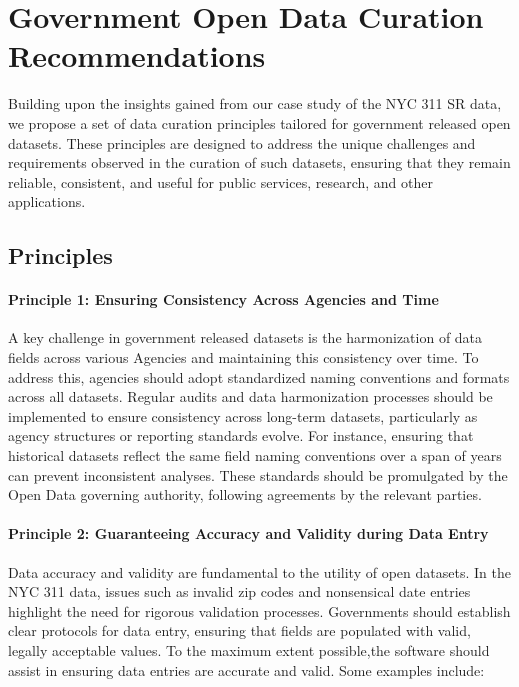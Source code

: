 \documentclass[linenumber]{jdsart}
\begin{document}
\section{Government Open Data Curation Recommendations}
\label{sec:recommendations}
Building upon the insights gained from our case study of the 
NYC 311 SR data, we propose a set of data 
curation principles tailored for government released open datasets. 
These principles are designed to address the unique challenges 
and requirements observed in the curation of such datasets, 
ensuring that they remain reliable, consistent, and useful for 
public services, research, and other applications.

\subsection{Principles}
\paragraph{Principle 1: Ensuring Consistency Across Agencies and Time}
A key challenge in government released datasets is the 
harmonization of data fields across various Agencies and 
maintaining this consistency over time. To address this, agencies should adopt 
standardized naming conventions and formats across all datasets. 
Regular audits and data harmonization processes should be 
implemented to ensure consistency across long\mbox{-}term datasets, 
particularly as agency structures or reporting standards evolve. 
For instance, ensuring that historical datasets reflect the same 
field naming conventions over a span of years can prevent 
inconsistent analyses. These standards should be promulgated 
by the Open Data governing authority, following agreements 
by the relevant parties.

\paragraph{Principle 2: Guaranteeing Accuracy and Validity during Data Entry}
Data accuracy and validity are fundamental to the utility of 
open datasets. In the NYC 311 data, issues such as 
invalid zip codes and nonsensical date entries 
highlight the need for rigorous validation processes. Governments 
should establish clear protocols for data entry, ensuring that 
fields are populated with valid, legally acceptable values. To 
the maximum extent possible,the software should assist in 
ensuring data entries are accurate and valid. Some examples include:
\end{document}
